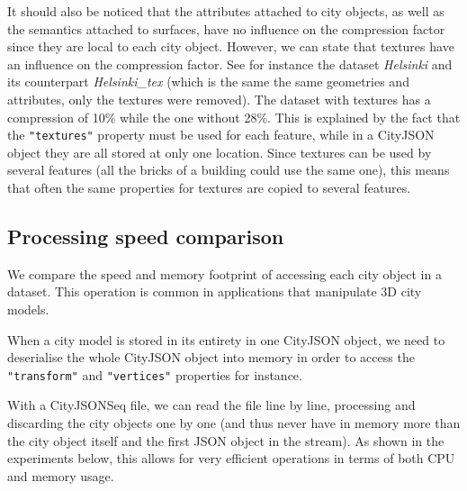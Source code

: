 \documentclass{isprs} %
\begin{document}
It should also be noticed that the attributes attached to city objects, as well as the semantics attached to surfaces, have no influence on the compression factor since they are local to each city object.
However, we can state that textures have an influence on the compression factor.
See for instance the dataset \emph{Helsinki} and its counterpart \emph{Helsinki\_tex} (which is the same the same geometries and attributes, only the textures were removed).
The dataset with textures has a compression of 10\% while the one without 28\%.
This is explained by the fact that the \texttt{"textures"} property must be used for each feature, while in a CityJSON object they are all stored at only one location.
Since textures can be used by several features (all the bricks of a building could use the same one), this means that often the same properties for textures are copied to several features.


\subsection{Processing speed comparison}

We compare the speed and memory footprint of accessing each city object in a dataset.
This operation is common in applications that manipulate 3D city models.

When a city model is stored in its entirety in one CityJSON object, we need to deserialise the whole CityJSON object into memory in order to access the \texttt{"transform"} and \texttt{"vertices"} properties for instance.

With a CityJSONSeq file, we can read the file line by line, processing and discarding the city objects one by one (and thus never have in memory more than the city object itself and the first JSON object in the stream).
As shown in the experiments below, this allows for very efficient operations in terms of both CPU and memory usage.

%
\end{document}
